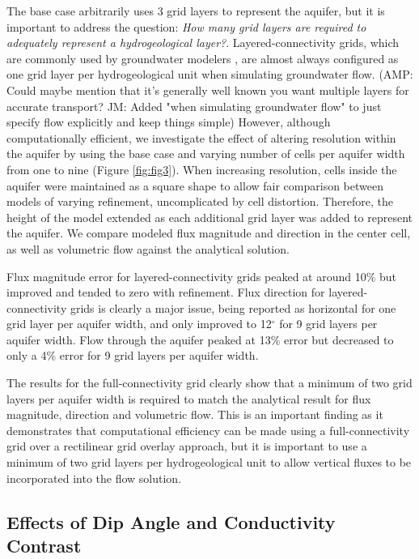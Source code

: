 \documentclass{article}
\begin{document}
The base case arbitrarily uses 3 grid layers to represent the aquifer, but it is important to address the question: \emph{How many grid layers are required to adequately represent a hydrogeological layer?}. Layered-connectivity grids, which are commonly used by groundwater modelers \citep{Reilly2004}, are almost always configured as one grid layer per hydrogeological unit when simulating groundwater flow. {\color{red} (AMP: Could maybe mention that it's generally well known you want multiple layers for accurate transport? JM: Added "when simulating groundwater flow" to just specify flow explicitly and keep things simple)} However, although computationally efficient, we investigate the effect of altering resolution within the aquifer by using the base case and varying number of cells per aquifer width from one to nine (Figure \ref{fig:fig3}). When increasing resolution, cells inside the aquifer were maintained as a square shape to allow fair comparison between models of varying refinement, uncomplicated by cell distortion. Therefore, the height of the model extended as each additional grid layer was added to represent the aquifer. We compare modeled flux magnitude and direction in the center cell, as well as volumetric flow against the analytical solution. 

Flux magnitude error for layered-connectivity grids peaked at around 10\% but improved and tended to zero with refinement. Flux direction for layered-connectivity grids is clearly a major issue, being reported as horizontal for one grid layer per aquifer width, and only improved to 12$^{\circ}$ for 9 grid layers per aquifer width. Flow through the aquifer peaked at 13\% error but decreased to only a 4\% error for 9 grid layers per aquifer width. 

The results for the full-connectivity grid clearly show that a minimum of two grid layers per aquifer width is required to match the analytical result for flux magnitude, direction and volumetric flow. This is an important finding as it demonstrates that computational efficiency can be made using a full-connectivity grid over a rectilinear grid overlay approach, but it is important to use a minimum of two grid layers per hydrogeological unit to allow vertical fluxes to be incorporated into the flow solution. 

\subsection{Effects of Dip Angle and Conductivity Contrast}
\end{document}
